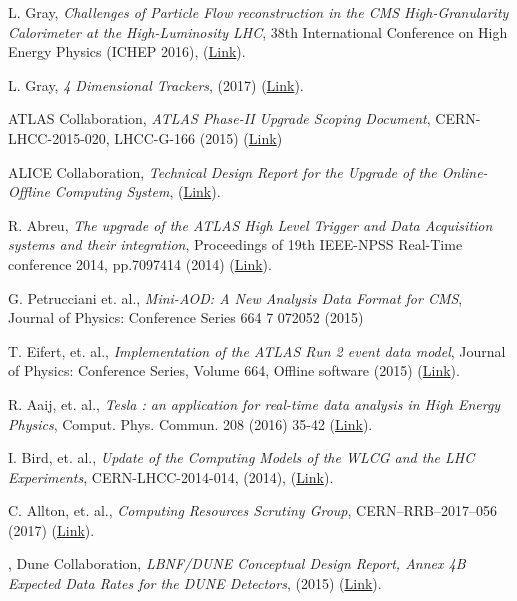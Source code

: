 \documentclass[11pt,letterpaper,fleqn]{article}
\begin{document}
\begin{thebibliography}{99}
L. Gray, 
\textit{Challenges of Particle Flow reconstruction in the CMS High-Granularity Calorimeter at the High-Luminosity LHC}, 
38th International Conference on High Energy Physics (ICHEP 2016), (\href{https://indico.cern.ch/event/432527/contributions/1071751/}{Link}). 

L. Gray, 
\textit{4 Dimensional Trackers},
(2017) (\href{https://indico.cern.ch/event/577003/contributions/2476434}{Link}).

ATLAS Collaboration, 
\textit{ATLAS Phase-II Upgrade Scoping Document}, 
CERN-LHCC-2015-020, LHCC-G-166 (2015) (\href{https://cds.cern.ch/record/2055248}{Link})

ALICE Collaboration, 
\textit{Technical Design Report for the Upgrade of the Online-Offline Computing System}, 
(\href{https://cds.cern.ch/record/2011297}{Link}).

R. Abreu, 
\textit{The upgrade of the ATLAS High Level Trigger and Data Acquisition systems and their integration}, 
Proceedings of 19th IEEE-NPSS Real-Time conference 2014, pp.7097414 (2014) (\href{https://cds.cern.ch/record/1702466/}{Link}). 

G. Petrucciani et. al., 
\textit{Mini-AOD: A New Analysis Data Format for CMS}, Journal of Physics: Conference Series 664 7 072052 (2015) 

T. Eifert, et. al., 
\textit{Implementation of the ATLAS Run 2 event data model}, 
Journal of Physics: Conference Series, Volume 664, Offline software (2015) (\href{http://iopscience.iop.org/article/10.1088/1742-6596/664/7/072045}{Link}).

R. Aaij, et. al., 
\textit{Tesla : an application for real-time data analysis in High Energy Physics}, 
Comput. Phys. Commun. 208 (2016) 35-42 (\href{https://cds.cern.ch/record/2147693}{Link}).

I. Bird, et. al., 
\textit{Update of the Computing Models of the WLCG and the LHC Experiments},
CERN-LHCC-2014-014, (2014), (\href{http://cds.cern.ch/record/1695401/files/LCG-TDR-002.pdf}{Link}).

C. Allton, et. al.,  
\textit{Computing Resources Scrutiny Group}, 
CERN–RRB–2017–056 (2017) (\href{https://indico.cern.ch/event/617821/contributions/2493341/attachments/1446478/2233022/CERN-RRB-2017-056_V2.pdf}{Link}). 

, 
Dune Collaboration, 
\textit{LBNF/DUNE Conceptual Design Report, Annex 4B Expected Data Rates for the DUNE Detectors}, 
(2015) (\href{http://lbne2-docdb.fnal.gov/cgi-bin/ShowDocument?docid=10720}{Link}). 


\end{thebibliography}
\end{document}
